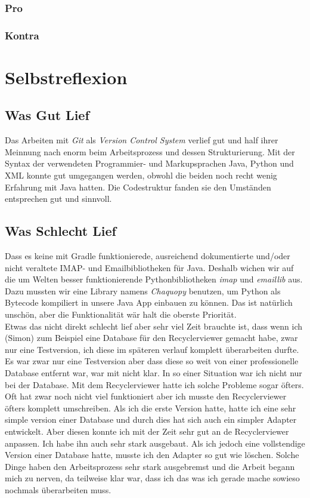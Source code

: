\documentclass[a4paper,11pt]{article}
\begin{document}
\subsubsection{Pro}
\subsubsection{Kontra}

\section{Selbstreflexion}

\subsection{Was Gut Lief}
Das Arbeiten mit \textit{Git} als \textit{Version Control System} verlief gut und half ihrer Meinnung nach enorm beim Arbeitsprozess und dessen Strukturierung. Mit der Syntax der verwendeten Programmier- und Markupsprachen Java, Python und XML konnte gut umgegangen werden, obwohl die beiden noch recht wenig Erfahrung mit Java hatten. Die Codestruktur fanden sie den Umständen entsprechen gut und sinnvoll.
\subsection{Was Schlecht Lief}
Dass es keine mit Gradle funktionierede, ausreichend dokumentierte und/oder nicht veraltete IMAP- und Emailbibliotheken für Java. Deshalb wichen wir auf die um Welten besser funktionierende Pythonbibliotheken \textit{imap} und \textit{emaillib} aus. Dazu mussten wir eine Library namens \textit{Chaquopy} benutzen, um Python als Bytecode kompiliert in unsere Java App einbauen zu können. Das ist natürlich unschön, aber die Funktionalität wär halt die oberste Priorität.\\

Etwas das nicht direkt schlecht lief aber sehr viel Zeit brauchte ist, dass wenn ich (Simon) zum Beispiel eine Database für den Recyclerviewer gemacht habe, zwar nur eine Testversion, 
ich diese im späteren verlauf komplett überarbeiten durfte. Es war zwar nur eine Testversion aber dass diese so weit von einer professionelle Database entfernt war, war mit nicht klar. 
In so einer Situation war ich nicht nur bei der Database. Mit dem Recyclerviewer hatte ich solche Probleme sogar öfters. Oft hat zwar noch nicht viel funktioniert aber ich musste den Recyclerviewer
öfters komplett umschreiben. Als ich die erste Version hatte, hatte ich eine sehr simple version einer Database und durch dies hat sich auch ein simpler Adapter entwickelt. 
Aber diesen konnte ich mit der Zeit sehr gut an de Recyclerviewer anpassen. Ich habe ihn auch sehr stark ausgebaut. Als ich jedoch eine vollstendige Version einer Database hatte, musste ich den 
Adapter so gut wie löschen. Solche Dinge haben den Arbeitsprozess sehr stark ausgebremst und die Arbeit begann mich zu nerven, da teilweise klar war, dass ich das was ich gerade
mache sowieso nochmals überarbeiten muss. 
\end{document}

